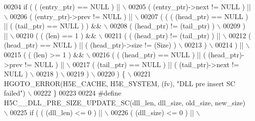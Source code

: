 \begin{DoxyCode}
00204 \textcolor{preprocessor}{if ( ( (entry\_ptr) == NULL ) ||                                              \(\backslash\)}
00205 \textcolor{preprocessor}{     ( (entry\_ptr)->next != NULL ) ||                                        \(\backslash\)}
00206 \textcolor{preprocessor}{     ( (entry\_ptr)->prev != NULL ) ||                                        \(\backslash\)}
00207 \textcolor{preprocessor}{     ( ( ( (head\_ptr) == NULL ) || ( (tail\_ptr) == NULL ) ) &&               \(\backslash\)}
00208 \textcolor{preprocessor}{       ( (head\_ptr) != (tail\_ptr) )                                          \(\backslash\)}
00209 \textcolor{preprocessor}{     ) ||                                                                    \(\backslash\)}
00210 \textcolor{preprocessor}{     ( ( (len) == 1 ) &&                                                     \(\backslash\)}
00211 \textcolor{preprocessor}{       ( ( (head\_ptr) != (tail\_ptr) ) ||                                     \(\backslash\)}
00212 \textcolor{preprocessor}{         ( (head\_ptr) == NULL ) || ( (head\_ptr)->size != (Size) )            \(\backslash\)}
00213 \textcolor{preprocessor}{       )                                                                     \(\backslash\)}
00214 \textcolor{preprocessor}{     ) ||                                                                    \(\backslash\)}
00215 \textcolor{preprocessor}{     ( ( (len) >= 1 ) &&                                                     \(\backslash\)}
00216 \textcolor{preprocessor}{       ( ( (head\_ptr) == NULL ) || ( (head\_ptr)->prev != NULL ) ||           \(\backslash\)}
00217 \textcolor{preprocessor}{         ( (tail\_ptr) == NULL ) || ( (tail\_ptr)->next != NULL )              \(\backslash\)}
00218 \textcolor{preprocessor}{       )                                                                     \(\backslash\)}
00219 \textcolor{preprocessor}{     )                                                                       \(\backslash\)}
00220 \textcolor{preprocessor}{   ) \{                                                                       \(\backslash\)}
00221 \textcolor{preprocessor}{    HGOTO\_ERROR(H5E\_CACHE, H5E\_SYSTEM, (fv), "DLL pre insert SC failed")     \(\backslash\)}
00222 \textcolor{preprocessor}{\}}
00223 
00224 \textcolor{preprocessor}{#define H5C\_\_DLL\_PRE\_SIZE\_UPDATE\_SC(dll\_len, dll\_size, old\_size, new\_size)    \(\backslash\)}
00225 \textcolor{preprocessor}{if ( ( (dll\_len) <= 0 ) ||                                                    \(\backslash\)}
00226 \textcolor{preprocessor}{     ( (dll\_size) <= 0 ) ||                                                   \(\backslash\)}

\end{DoxyCode}
